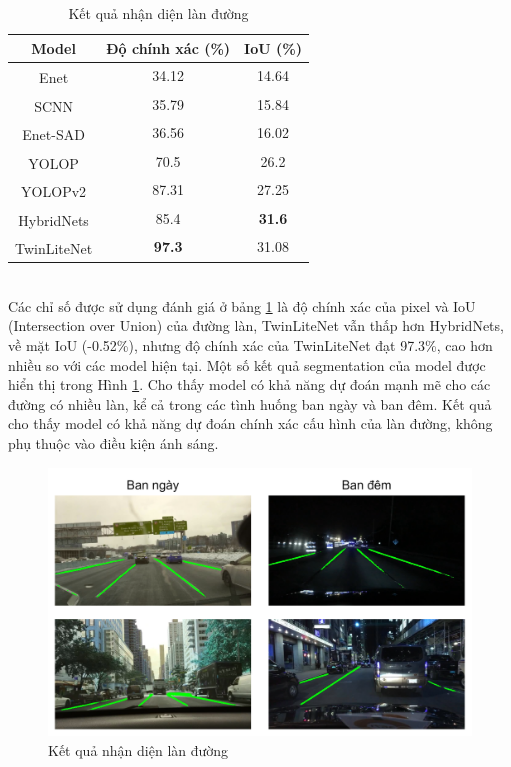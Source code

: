 \begin{table}[!hbt]
\begin{center}
\begin{tabular}{@{}ccc@{}}
\toprule
\textbf{Model} & \textbf{Độ chính xác (\%)} & \textbf{IoU (\%)} \\ \midrule
Enet\textsuperscript{\cite{enet}}                 & 34.12                      & 14.64             \\
SCNN\textsuperscript{\cite{scnn}}                 & 35.79                      & 15.84             \\
Enet-SAD\textsuperscript{\cite{enetsad}}          & 36.56                      & 16.02             \\
YOLOP\textsuperscript{\cite{yolop}}               & 70.5                       & 26.2              \\
YOLOPv2\textsuperscript{\cite{yolopv2}}           & 87.31                      & 27.25             \\
HybridNets\textsuperscript{\cite{hybridnets}}     & 85.4                       & \textbf{31.6}     \\ \midrule
TwinLiteNet\textsuperscript{\cite{twinlitenet}}   & \textbf{97.3}              & 31.08             \\ \bottomrule
\end{tabular}
\caption{\label{lane-detection-table}Kết quả nhận diện làn đường}
\end{center}
\end{table}\\
Các chỉ số được sử dụng đánh giá ở bảng \ref{lane-detection-table} là độ chính xác của pixel và IoU (Intersection over Union) của đường làn, TwinLiteNet vẫn thấp hơn HybridNets, về mặt IoU (-0.52\%), nhưng độ chính xác của TwinLiteNet đạt 97.3\%, cao hơn nhiều so với các model hiện tại. Một số kết quả segmentation của model được hiển thị trong Hình \ref{lane_visualization_results}. Cho thấy model có khả năng dự đoán mạnh mẽ cho các đường có nhiều làn, kể cả trong các tình huống ban ngày và ban đêm. Kết quả cho thấy model có khả năng dự đoán chính xác cấu hình của làn đường, không phụ thuộc vào điều kiện ánh sáng.\\
\begin{figure}[!hbt]
\begin{center}
    \includegraphics[width=12cm]{img/4_Implement/ai/visualization_results.png}
    \caption{\label{lane_visualization_results}Kết quả nhận diện làn đường}
\end{center}
\end{figure}\\
